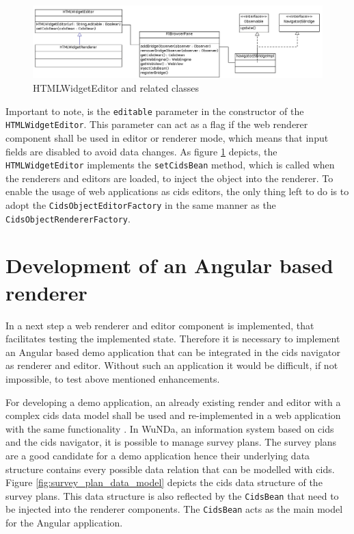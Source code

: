 \begin{figure}
	\centering	\includegraphics[width=1.0\textwidth]{./img/classDiagramms/html_editor.png}
	\caption{HTMLWidgetEditor and related classes}
	\label{fig:class_diag_html_widget_editor}
\end{figure}

Important to note, is the \texttt{editable} parameter in the constructor of the \texttt{HTMLWidgetEditor}.
This parameter can act as a flag if  the web renderer component shall be used in editor or renderer mode, which means that input fields are disabled to avoid data changes.
As figure \ref{fig:class_diag_html_widget_editor} depicts, the \texttt{HTMLWidgetEditor} implements the \texttt{setCidsBean} method, which is called when the renderers and editors are loaded, to inject the object into the renderer.
To enable the usage of web applications as cids editors, the only thing left to do is to adopt the \texttt{CidsObjectEditorFactory} in the same manner as the \texttt{CidsObjectRendererFactory}.

\section{Development of an Angular based renderer}

In a next step a web renderer and editor component is implemented, that facilitates testing the implemented state.
Therefore it is necessary to implement an Angular based demo application that can be integrated in the cids navigator as renderer and editor.
Without such an application it would be difficult, if not impossible, to test above mentioned enhancements.

For developing a demo application, an already existing render and editor with a complex cids data model shall be used and re-implemented in a web application with the same functionality .
In WuNDa, an information system based on cids and the cids navigator, it is possible to manage survey plans.
The survey plans are a good candidate for a demo application hence their underlying data structure contains every possible data relation that can be modelled with cids.
Figure \ref{fig:survey_plan_data_model} depicts the cids data structure of the survey plans.
This data structure is also reflected by the \texttt{CidsBean} that need to be injected into the renderer components.
The \texttt{CidsBean} acts as the main model for the Angular application.

